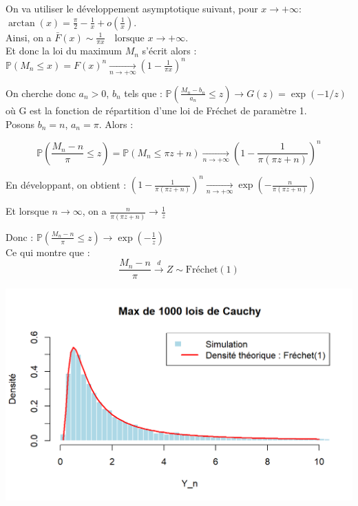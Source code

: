 \documentclass{article}
\theoremstyle{plain}
\theoremstyle{definition}
\theoremstyle{plain}
\begin{document}
\noindent On va utiliser le développement asymptotique suivant, pour \( x \to +\infty \): $\arctan(x) = \frac{\pi}{2} - \frac{1}{x} + o\left(\frac{1}{x}\right) $. \\

\noindent Ainsi, on a $\bar{F}(x) \sim \frac{1}{\pi x} \quad \text{lorsque } x \to +\infty$. \\
\noindent Et donc la loi du maximum \( M_n \) s’écrit alors : $ \mathbb{P}(M_n \leq x) = F(x)^n \xrightarrow[n \to +\infty]{} \left(1 - \frac{1}{\pi x}\right)^n $


\noindent On cherche donc \( a_n > 0 \), \( b_n \) tels que : $ \mathbb{P}\left( \frac{M_n - b_n}{a_n} \leq z \right) \to G(z) = \exp(-1/z) $ où G est la fonction de répartition d'une loi de Fréchet de paramètre 1. \\

\noindent Posons \( b_n = n \), \( a_n = \pi \). Alors :

\[
\mathbb{P}\left( \frac{M_n - n}{\pi} \leq z \right) = \mathbb{P}\left( M_n \leq \pi z + n \right) \xrightarrow[n \to +\infty]{} \left(1 - \frac{1}{\pi(\pi z + n)}\right)^n
\]

\noindent En développant, on obtient : $\left(1 - \frac{1}{\pi(\pi z + n)}\right)^n \xrightarrow[n \to +\infty]{} \exp\left(- \frac{n}{\pi(\pi z + n)} \right)$

\noindent Et lorsque \( n \to \infty \), on a $ \frac{n}{\pi(\pi z + n)} \to \frac{1}{z} $

\noindent Donc : $\mathbb{P}\left( \frac{M_n - n}{\pi} \leq z \right) \to \exp\left(-\frac{1}{z} \right)$ \\

\noindent Ce qui montre que :
\[
\frac{M_n - n}{\pi} \xrightarrow{d} Z \sim \text{Fréchet}(1)
\]


\begin{center}
	\includegraphics[scale=0.8]{./images/Max_Cauchy.png} 
\end{center}
\end{document}
